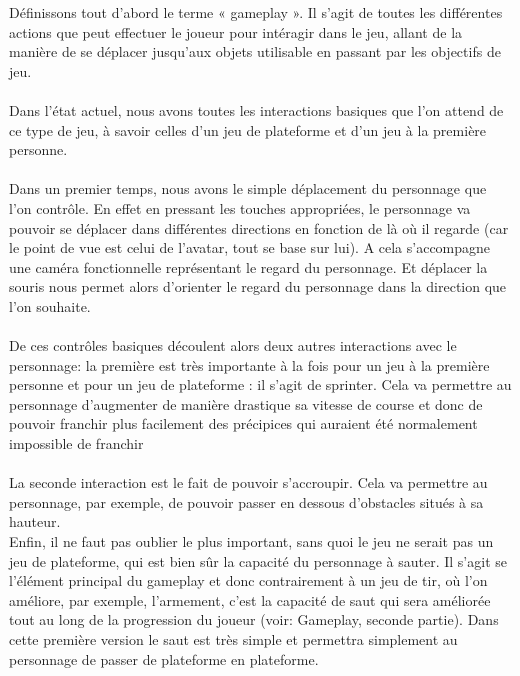 \documentclass[a4paper]{article}
\begin{document}
Définissons tout d’abord le terme « gameplay ». Il s'agit de toutes les différentes actions que peut effectuer le joueur  pour intéragir dans le jeu, allant de la manière de se déplacer jusqu'aux objets utilisable en passant par les objectifs de jeu.\\
 \\
Dans l'état actuel, nous avons toutes les interactions basiques que l'on attend de ce type de jeu, à savoir celles d'un  jeu de plateforme et d'un jeu à la première personne.\\
\\
Dans un premier temps, nous avons le simple déplacement du personnage que l'on contrôle. En effet en pressant les touches appropriées, le personnage va pouvoir se déplacer dans différentes directions en fonction de là où il regarde (car le point de vue est celui de l'avatar, tout se base sur lui). A cela s'accompagne une caméra fonctionnelle représentant le regard du personnage. Et déplacer la souris nous permet alors d'orienter le regard du personnage  dans la direction que l'on souhaite.\\
\\
De ces contrôles basiques découlent alors deux autres interactions avec le personnage: la première est très importante à la fois pour un jeu à la première personne et pour un jeu de plateforme : il s'agit de sprinter. Cela va permettre au personnage d'augmenter de manière drastique sa vitesse de course et donc de pouvoir franchir plus facilement des précipices qui auraient été normalement impossible de franchir\\
\\
La seconde interaction est le fait de pouvoir s'accroupir. Cela va permettre au personnage, par exemple, de pouvoir passer en dessous d'obstacles situés à sa hauteur.\\
Enfin, il ne faut pas oublier le plus important, sans quoi le jeu ne serait pas un  jeu de plateforme, qui est bien sûr la capacité du personnage à sauter. Il s'agit se l'élément principal du gameplay et donc contrairement à un jeu de tir, où l'on améliore, par exemple, l'armement, c'est la capacité de saut qui sera améliorée tout au long de la progression du joueur (voir: Gameplay, seconde partie). Dans cette première version le saut est très simple et permettra simplement au personnage de passer de plateforme en plateforme.
\\

\pagebreak
\end{document}
